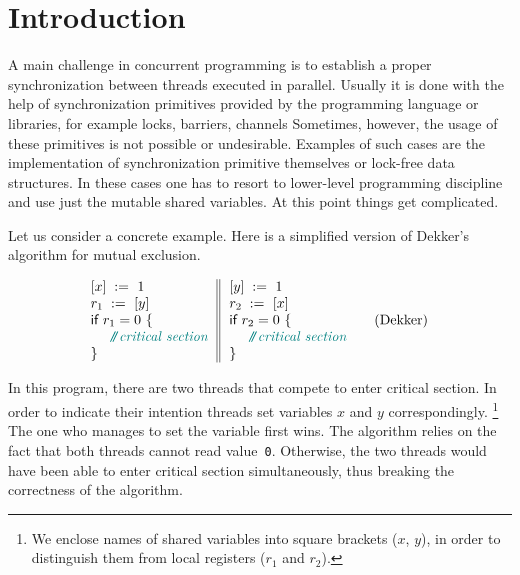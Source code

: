 \section{Introduction}

A main challenge in concurrent programming is 
to establish a proper synchronization between threads executed in parallel.     
Usually it is done with the help of synchronization primitives
provided by the programming language or libraries,
for example locks, barriers, channels \etc
Sometimes, however, the usage of these primitives
is not possible or undesirable. 
Examples of such cases are the implementation 
of synchronization primitive themselves
or lock-free data structures.
In these cases one has to resort to 
lower-level programming discipline and 
use just the mutable shared variables. 
At this point things get complicated.


Let us consider a concrete example.
Here is a simplified version of Dekker's algorithm for mutual exclusion.

\begin{equation*}
\inarrII{
  \writeInst{}{x}{1} \\
  \readInst{}{r_1}{y}  \\
  \kw{if} {r_1 = 0} ~\{ \\
  ~~ \comment{critical section} \\
  \}
}{
  \writeInst{}{y}{1} \\
  \readInst{}{r_2}{x}  \\
  \kw{if} {r_2 = 0} ~\{ \\
  ~~ \comment{critical section} \\
  \}
}
\tag{Dekker}\label{ex:Dekker}
\end{equation*}

In this program, there are two threads that compete to enter critical section.
In order to indicate their intention threads set 
variables $x$ and $y$ correspondingly.%
\footnote{We enclose names of shared variables into square brackets
(\ie $x$, $y$), in order to distinguish them 
from local registers (\ie $r_1$ and $r_2$).}
The one who manages to set the variable first wins.
The algorithm relies on the fact that both threads cannot read value~\texttt{0}.
Otherwise, the two threads would have been able 
to enter critical section simultaneously, 
thus breaking the correctness of the algorithm.

